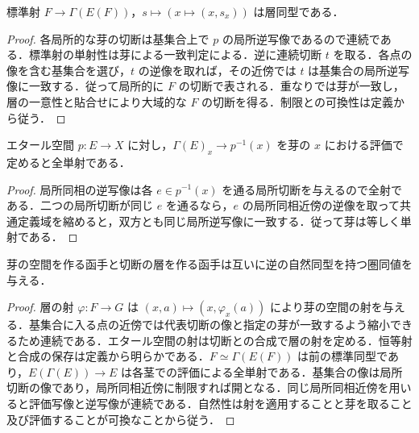 \begin{prop}[層から得た芽の空間の切断]
標準射 $F\to\Gamma(E(F))$，$s\mapsto(x\mapsto(x,s_x))$ は層同型である．
\end{prop}
\begin{proof}
各局所的な芽の切断は基集合上で $p$ の局所逆写像であるので連続である．標準射の単射性は芽による一致判定による．逆に連続切断 $t$ を取る．各点の像を含む基集合を選び，$t$ の逆像を取れば，その近傍では $t$ は基集合の局所逆写像に一致する．従って局所的に $F$ の切断で表される．重なりでは芽が一致し，層の一意性と貼合せにより大域的な $F$ の切断を得る．制限との可換性は定義から従う．
\end{proof}
\begin{prop}[切断の芽とエタール空間の点]
エタール空間 $p:E\to X$ に対し，$\Gamma(E)_x\to p^{-1}(x)$ を芽の $x$ における評価で定めると全単射である．
\end{prop}
\begin{proof}
局所同相の逆写像は各 $e\in p^{-1}(x)$ を通る局所切断を与えるので全射である．二つの局所切断が同じ $e$ を通るなら，$e$ の局所同相近傍の逆像を取って共通定義域を縮めると，双方とも同じ局所逆写像に一致する．従って芽は等しく単射である．
\end{proof}
\begin{prop}[エタール空間と集合値層の圏の同値]
芽の空間を作る函手と切断の層を作る函手は互いに逆の自然同型を持つ圏同値を与える．
\end{prop}
\begin{proof}
層の射 $\varphi:F\to G$ は $(x,a)\mapsto(x,\varphi_x(a))$ により芽の空間の射を与える．基集合に入る点の近傍では代表切断の像と指定の芽が一致するよう縮小できるため連続である．エタール空間の射は切断との合成で層の射を定める．恒等射と合成の保存は定義から明らかである．$F\simeq\Gamma(E(F))$ は前の標準同型であり，$E(\Gamma(E))\to E$ は各茎での評価による全単射である．基集合の像は局所切断の像であり，局所同相近傍に制限すれば開となる．同じ局所同相近傍を用いると評価写像と逆写像が連続である．自然性は射を適用することと芽を取ること及び評価することが可換なことから従う．
\end{proof}
